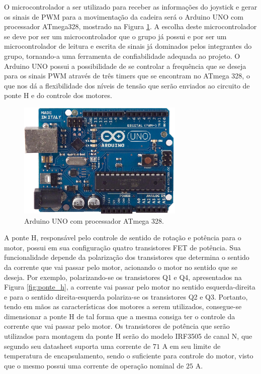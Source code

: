 O microcontrolador a ser utilizado para receber as informações 
do joystick e gerar os sinais de PWM para a movimentação 
da cadeira será o Arduino UNO com processador ATmega328, mostrado na Figura \ref{fig:arduino}. A escolha deste 
microcontrolador se deve por ser um microcontrolador que o grupo 
já possui e por ser um microcontrolador de leitura e escrita de 
sinais já dominados pelos integrantes do grupo, tornando-a 
uma ferramenta de confiabilidade adequada ao projeto. O Arduino UNO
possui a possibilidade de se controlar a frequência que se deseja 
para os sinais 
PWM através de três timers que se encontram no ATmega 328, o que nos 
dá a flexibilidade dos níveis de tensão que serão enviados ao 
circuito de ponte H e do controle dos motores.

\begin{figure}[H]
  \centering
    \includegraphics[width=\textwidth]{figuras/arduino.eps}
  \caption{Arduino UNO com processador ATmega 328.}
  \label{fig:arduino}
\end{figure}

A ponte H, responsável pelo controle de sentido de rotação e 
potência para o motor, possui em sua configuração quatro 
transistores FET de potência. Sua funcionalidade depende 
da polarização dos transistores que determina o sentido da corrente 
que vai passar pelo motor, acionando o motor no sentido que se deseja. 
Por exemplo, polarizando-se os transistores Q1 e Q4, apresentados 
na Figura \ref{fig:ponte_h}, a corrente vai passar pelo motor no 
sentido esquerda-direita e para o sentido direita-esquerda 
polariza-se os transistores Q2 e Q3. Portanto, tendo em mãos as 
características dos motores a serem utilizados, consegue-se 
dimensionar a ponte H de tal forma que a mesma consiga ter o 
controle da corrente que vai passar pelo motor. Os transistores 
de potência que serão utilizados para montagem da ponte H serão do 
modelo IRF3505 de canal N, que segundo seu datasheet suporta uma 
corrente de $71$ A em seu limite de temperatura de encapsulamento, 
sendo o suficiente para controle do motor, visto que o mesmo 
possui uma corrente de operação nominal de $25$ A.

